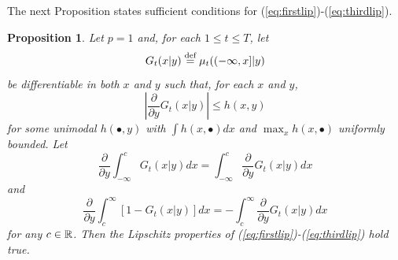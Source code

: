 \documentclass{article}              %
\newtheorem{proposition}{Proposition}
\begin{document}
\noindent The next Proposition states sufficient conditions for (\ref{eq:firstlip})-(\ref{eq:thirdlip}).
\begin{proposition}
\label{lem:dif}Let $p=1$ and, for each $1\leq t\leq T$, let 
\[
G_{t}(x|y)\stackrel{\text{\rm def}}{=}\mu_{t}((-\infty,x]|y)
\]
be differentiable in both $x$ and $y$ such that, for each $x$ and $y$,
\[
\left|\frac{\partial}{\partial y}G_{t}(x|y)\right|\leq h(x,y)
\]
for some unimodal $h(\bullet,y)$ with $\int h(x,\bullet)dx$ and
$\max_{x}h(x,\bullet)$ uniformly bounded. Let 
$$\frac{\partial}{\partial y}\int_{-\infty}^{c}G_{t}(x|y)dx=\int_{-\infty}^{c}\frac{\partial}{\partial y}G_{t}(x|y)dx$$
and 
$$\frac{\partial}{\partial y}\int_{c}^{\infty}[1-G_{t}(x|y)]dx=-\int_{c}^{\infty}\frac{\partial}{\partial y}G_{t}(x|y)dx$$
for any $c\in\mathbb{R}$. Then the Lipschitz properties of (\ref{eq:firstlip})-(\ref{eq:thirdlip})
hold true. 
\end{proposition}
\end{document}
